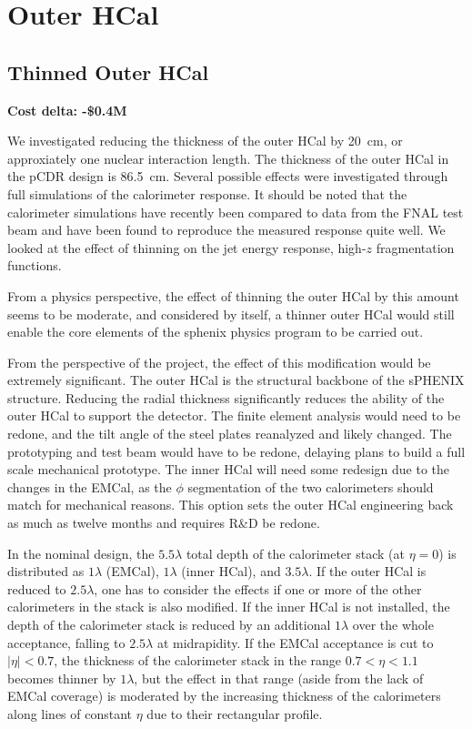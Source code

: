 \section{Outer HCal}
\subsection{Thinned Outer HCal}
\label{ohcal_thin}

\textbf{Cost delta: -\$0.4M}

We investigated reducing the thickness of the outer HCal by 20~cm, or
approxiately one nuclear interaction length.  The thickness of the
outer HCal in the pCDR design is 86.5~cm.  Several possible effects
were investigated through full \geant simulations of the calorimeter
response.  It should be noted that the calorimeter simulations have
recently been compared to data from the FNAL test beam and have been
found to reproduce the measured response quite well.  We looked at the
effect of thinning on the jet energy response, high-$z$ fragmentation
functions.

From a physics perspective, the effect of thinning the outer HCal by
this amount seems to be moderate, and considered by itself, a thinner
outer HCal would still enable the core elements of the sphenix physics
program to be carried out.

From the perspective of the project, the effect of this modification
would be extremely significant.  The outer HCal is the structural
backbone of the sPHENIX structure.  Reducing the radial thickness
significantly reduces the ability of the outer HCal to support the
detector.  The finite element analysis would need to be redone, and
the tilt angle of the steel plates reanalyzed and likely changed. The
prototyping and test beam would have to be redone, delaying plans to
build a full scale mechanical prototype.  The inner HCal will need
some redesign due to the changes in the EMCal, as the $\phi$
segmentation of the two calorimeters should match for mechanical
reasons.  This option sets the outer HCal engineering back as much as
twelve months and requires R\&D be redone.

In the nominal design, the $5.5 \lambda$ total depth of the
calorimeter stack (at $\eta = 0$) is distributed as $1 \lambda$
(EMCal), $1 \lambda$ (inner HCal), and $3.5 \lambda$.  If the outer
HCal is reduced to $2.5 \lambda$, one has to consider the effects if
one or more of the other calorimeters in the stack is also modified.
If the inner HCal is not installed, the depth of the calorimeter stack
is reduced by an additional $1 \lambda$ over the whole acceptance,
falling to $2.5 \lambda$ at midrapidity.  If the EMCal acceptance is
cut to $|\eta| < 0.7$, the thickness of the calorimeter stack in the
range $0.7 < \eta < 1.1$ becomes thinner by $1 \lambda$, but the
effect in that range (aside from the lack of EMCal coverage) is
moderated by the increasing thickness of the calorimeters along lines
of constant $\eta$ due to their rectangular profile.


